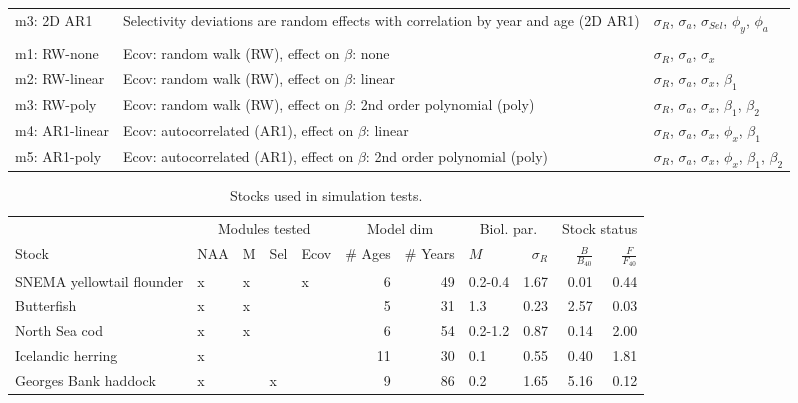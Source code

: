 \documentclass[]{article}
\begin{document}
\begin{landscape}
\begin{table}
\begin{tabular}[t]{lll}
\hspace{1em}m3: 2D AR1 & Selectivity deviations are random effects with correlation by year and age (2D AR1) & $\sigma_R$, $\sigma_a$, $\sigma_{Sel}$, $\phi_y$, $\phi_a$\\
\addlinespace[0.3em]
\multicolumn{3}{l}{\textbf{Ecov-Recruitment (Ecov)}}\\
\hspace{1em}m1: RW-none & Ecov: random walk (RW), effect on $\beta$: none & $\sigma_R$, $\sigma_a$, $\sigma_x$\\
\hspace{1em}m2: RW-linear & Ecov: random walk (RW), effect on $\beta$: linear & $\sigma_R$, $\sigma_a$, $\sigma_x$, $\beta_1$\\
\hspace{1em}m3: RW-poly & Ecov: random walk (RW), effect on $\beta$: 2nd order polynomial (poly) & $\sigma_R$, $\sigma_a$, $\sigma_x$, $\beta_1$, $\beta_2$\\
\hspace{1em}m4: AR1-linear & Ecov: autocorrelated (AR1), effect on $\beta$: linear & $\sigma_R$, $\sigma_a$, $\sigma_x$, $\phi_x$, $\beta_1$\\
\hspace{1em}m5: AR1-poly & Ecov: autocorrelated (AR1), effect on $\beta$: 2nd order polynomial (poly) & $\sigma_R$, $\sigma_a$, $\sigma_x$, $\phi_x$, $\beta_1$, $\beta_2$\\
\bottomrule
\end{tabular}
\end{table}
\end{landscape}

\pagebreak

\begin{table}

\caption{\label{tab:stock-list}Stocks used in simulation tests.}
\centering
\begin{tabular}[t]{lllllrrlrrr}
\toprule
\multicolumn{1}{c}{ } & \multicolumn{4}{c}{Modules tested} & \multicolumn{2}{c}{Model dim} & \multicolumn{2}{c}{Biol. par.} & \multicolumn{2}{c}{Stock status} \\
\cmidrule(l{3pt}r{3pt}){2-5} \cmidrule(l{3pt}r{3pt}){6-7} \cmidrule(l{3pt}r{3pt}){8-9} \cmidrule(l{3pt}r{3pt}){10-11}
Stock & NAA & M & Sel & Ecov & \# Ages & \# Years & $M$ & $\sigma_R$ & $\frac{B}{B_{40}}$ & $\frac{F}{F_{40}}$\\
\midrule
SNEMA yellowtail flounder & x & x &  & x & 6 & 49 & 0.2-0.4 & 1.67 & 0.01 & 0.44\\
Butterfish & x & x &  &  & 5 & 31 & 1.3 & 0.23 & 2.57 & 0.03\\
North Sea cod & x & x &  &  & 6 & 54 & 0.2-1.2 & 0.87 & 0.14 & 2.00\\
Icelandic herring & x &  &  &  & 11 & 30 & 0.1 & 0.55 & 0.40 & 1.81\\
Georges Bank haddock & x &  & x &  & 9 & 86 & 0.2 & 1.65 & 5.16 & 0.12\\
\bottomrule
\end{tabular}
\end{table}
\end{document}

